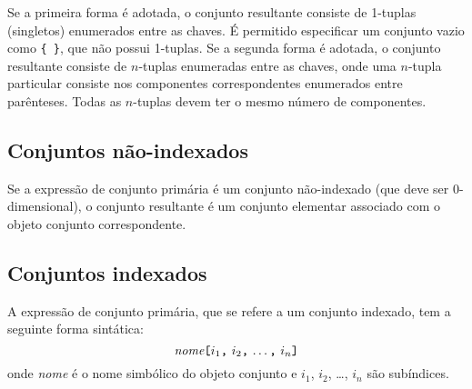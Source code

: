\documentclass[11pt, brazil]{report}
\begin{document}
Se a primeira forma é adotada, o conjunto resultante consiste
de 1-tuplas (singletos) enumerados entre as chaves.
É permitido especificar um conjunto vazio como {\tt\{\ \}},
que não possui 1-tuplas. Se a segunda forma é adotada,
o conjunto resultante consiste de $n$-tuplas enumeradas entre as chaves,
onde uma $n$-tupla particular consiste nos componentes correspondentes
enumerados entre parênteses. Todas as $n$-tuplas devem ter o mesmo
número de componentes.

%

\subsection{Conjuntos não-indexados}

Se a expressão de conjunto primária é um conjunto não-indexado
(que deve ser 0-dimensional), o conjunto resultante é um conjunto
elementar associado com o objeto conjunto correspondente.


\subsection{Conjuntos indexados}

A expressão de conjunto primária, que se refere a um conjunto indexado,
tem a seguinte forma sintática:
$$\mbox{{\it nome}{\tt[}$i_1${\tt,} $i_2${\tt,} \dots{\tt,}
$i_n${\tt]}}$$
onde {\it nome} é o nome simbólico do objeto conjunto e $i_1$, $i_2$,
\dots, $i_n$ são subíndices.

\end{document}
